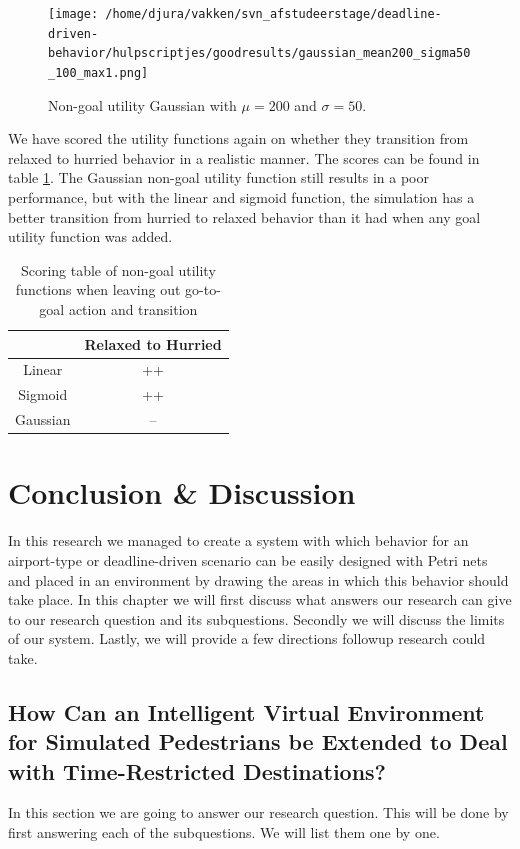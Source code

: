 \documentclass[11pt, a4paper]{book}
\begin{document}
\begin{figure}
\centering
\texttt{[image: /home/djura/vakken/svn\_afstudeerstage/deadline-driven-behavior/hulpscriptjes/goodresults/gaussian\_mean200\_sigma50\_100\_max1.png]}
\caption{Non-goal utility Gaussian with $\mu=200$ and $\sigma=50$.}
\label{fig:Gaussian_mean200_sigma50_100_max1}
\end{figure}

We have scored the utility functions again on whether they transition from relaxed to hurried behavior in a realistic manner. The scores can be found in table \ref{tab:secondquantitativetable}. The Gaussian non-goal utility function still results in a poor performance, but with the linear and sigmoid function, the simulation has a better transition from hurried to relaxed behavior than it had when any goal utility function was added.

\begin{table}
\centering
\begin{tabular}{|c|c|}
\hline 
 & Relaxed to Hurried\\ 
\hline 
Linear & ++  \\ 
\hline 
Sigmoid & ++  \\ 
\hline 
Gaussian & --\\
\hline
\end{tabular} 
\caption{Scoring table of non-goal utility functions when leaving out go-to-goal action and transition}
\label{tab:secondquantitativetable}
\end{table}

\chapter{Conclusion \& Discussion}
\label{chap:conclusiondiscusssion}
In this research we managed to create a system with which behavior for an airport-type or deadline-driven scenario can be easily designed with Petri nets and placed in an environment by drawing the areas in which this behavior should take place. In this chapter we will first discuss what answers our research can give to our research question and its subquestions. Secondly we will discuss the limits of our system. Lastly, we will provide a few directions followup research could take.

\section{How Can an Intelligent Virtual Environment for Simulated Pedestrians be Extended to Deal with Time-Restricted Destinations?}
In this section we are going to answer our research question. This will be done by first answering each of the subquestions. We will list them one by one.
\end{document}
